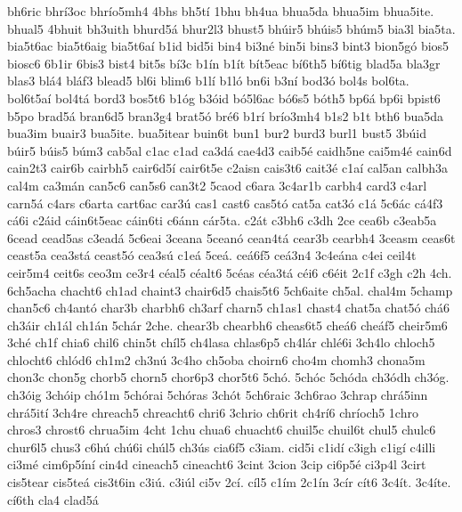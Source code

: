 {bh6ric
bhr^^ed3oc
bhr^^edo5mh4
4bhs
bh5t^^ed
1bhu
bh4ua
bhua5da
bhua5im
bhua5ite.
bhual5
4bhuit
bh3uith
bhurd5^^e1
bhur2l3
bhust5
bh^^fair5
bh^^fais5
bh^^fam5
bia3l
bia5ta.
bia5t6ac
bia5t6aig
bia5t6a^^ed
b1id
bid5i
bin4
bi3n^^e9
bin5i
bins3
bint3
bion5g^^f3
bios5
biosc6
6b1ir
6bis3
bist4
bit5s
b^^ed3c
b1^^edn
b1^^edt
b^^edt5eac
b^^ed6th5
b^^ed6tig
blad5a
bla3gr
blas3
bl^^e14
bl^^e1f3
blead5
bl6i
blim6
b1l^^ed
b1l^^f3
bn6i
b3n^^ed
bod3^^f3
bol4s
bol6ta.
bol6t5a^^ed
bol4t^^e1
bord3
bos5t6
b1^^f3g
b3^^f3id
b^^f35l6ac
b^^f36s5
b^^f3th5
bp6^^e1
bp6i
bpist6
b5po
brad5^^e1
bran6d5
bran3g4
brat5^^f3
br^^e96
b1r^^ed
br^^edo3mh4
b1s2
b1t
bth6
bua5da
bua3im
buair3
bua5ite.
bua5itear
buin6t
bun1
bur2
burd3
burl1
bust5
3b^^faid
b^^fair5
b^^fais5
b^^fam3
cab5al
c1ac
c1ad
ca3d^^e1
cae4d3
caib5^^e9
caidh5ne
cai5m4^^e9
cain6d
cain2t3
cair6b
cairbh5
cair6d5^^ed
cair6t5e
c2aisn
cais3t6
cait3^^e9
c1a^^ed
cal5an
calbh3a
cal4m
ca3m^^e1n
can5c6
can5s6
can3t2
5caod
c6ara
3c4ar1b
carbh4
card3
c4arl
carn5^^e1
c4ars
c6arta
cart6ac
car3^^fa
cas1
cast6
cas5t^^f3
cat5a
cat3^^f3
c1^^e1
5c6^^e1c
c^^e14f3
c^^e16i
c2^^e1id
c^^e1in6t5eac
c^^e1in6ti
c6^^e1nn
c^^e1r5ta.
c2^^e1t
c3bh6
c3dh
2ce
cea6b
c3eab5a
6cead
cead5as
c3ead^^e1
5c6eai
3ceana
5cean^^f3
cean4t^^e1
cear3b
cearbh4
3ceasm
ceas6t
ceast5a
cea3st^^e1
ceast5^^f3
cea3s^^fa
c1e^^e1
5ce^^e1.
ce^^e16f5
ce^^e13n4
3c4e^^e1na
c4ei
ceil4t
ceir5m4
ceit6s
ceo3m
ce3r4
c^^e9al5
c^^e9alt6
5c^^e9as
c^^e9a3t^^e1
c^^e9i6
c6^^e9it
2c1f
c3gh
c2h
4ch.
6ch5acha
chacht6
ch1ad
chaint3
chair6d5
chais5t6
5ch6aite
ch5al.
chal4m
5champ
chan5c6
ch4ant^^f3
char3b
charbh6
ch3arf
charn5
ch1as1
chast4
chat5a
chat5^^f3
ch^^e16
ch3^^e1ir
ch1^^e1l
ch1^^e1n
5ch^^e1r
2che.
chear3b
chearbh6
cheas6t5
che^^e16
che^^e1f5
cheir5m6
3ch^^e9
ch1f
chia6
chil6
chin5t
ch^^edl5
ch4lasa
chlas6p5
ch4l^^e1r
chl^^e96i
3ch4lo
chloch5
chlocht6
chl^^f3d6
ch1m2
ch3n^^fa
3c4ho
ch5oba
choirn6
cho4m
chomh3
chona5m
chon3c
chon5g
chorb5
chorn5
chor6p3
chor5t6
5ch^^f3.
5ch^^f3c
5ch^^f3da
ch3^^f3dh
ch3^^f3g.
ch3^^f3ig
3ch^^f3ip
ch^^f31m
5ch^^f3rai
5ch^^f3ras
3ch^^f3t
5ch6raic
3ch6rao
3chrap
chr^^e15inn
chr^^e15it^^ed
3ch4re
chreach5
chreacht6
chri6
3chrio
ch6rit
ch4r^^ed6
chr^^edoch5
1chro
chros3
chrost6
chrua5im
4cht
1chu
chua6
chuacht6
chuil5c
chuil6t
chul5
chulc6
chur6l5
chus3
c6h^^fa
ch^^fa6i
ch^^fal5
ch3^^fas
cia6f5
c3iam.
cid5i
c1id^^ed
c3igh
c1ig^^ed
c4illi
ci3m^^e9
cim6p5^^edn^^ed
cin4d
cineach5
cineacht6
3cint
3cion
3cip
ci6p5^^e9
ci3p4l
3cirt
cis5tear
cis5te^^e1
cis3t6in
c3i^^fa.
c3i^^fal
ci5v
2c^^ed.
c^^edl5
c1^^edm
2c1^^edn
3c^^edr
c^^edt6
3c4^^edt.
3c4^^edte.
c^^ed6th
cla4
clad5^^e1
}

